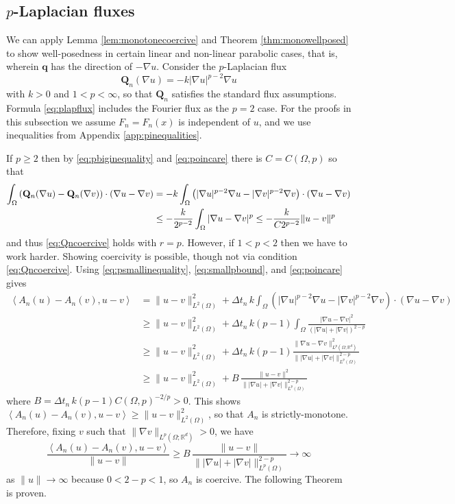 \documentclass[final,leqno,onefignum,onetabnum]{siamltex1213bueler}
\newcommand\bq{\mathbf{q}}
\newcommand\bQ{\mathbf{Q}}
\renewcommand{\grad}{\nabla}
\newcommand{\ip}[2]{\ensuremath{\left<#1,#2\right>}}
\newcommand\RR{\mathbb{R}}
\begin{document}
\subsection{$p$-Laplacian fluxes} \label{subsec:plap}  We can apply Lemma \ref{lem:monotonecoercive} and Theorem \ref{thm:monowellposed} to show well-posedness in certain linear and non-linear parabolic cases, that is, wherein $\bq$ has the direction of $-\grad u$.  Consider the $p$-Laplacian \cite{Evans2010} flux
\begin{equation}
  \bQ_n(\grad u) = - k |\grad u|^{p-2} \grad u \label{eq:plapflux}
\end{equation}
with $k>0$ and $1<p<\infty$, so that $\bQ_n$ satisfies the standard flux assumptions.  Formula \eqref{eq:plapflux} includes the Fourier flux as the $p=2$ case.  For the proofs in this subsection we assume $F_n=F_n(x)$ is independent of $u$, and we use inequalities from Appendix \ref{app:pinequalities}.

If $p\ge 2$ then by \eqref{eq:pbiginequality} and \eqref{eq:poincare} there is $C=C(\Omega,p)$ so that
\begin{align}
\int_\Omega \left(\bQ_n(\grad u) - \bQ_n(\grad v)\right)\cdot (\grad u - \grad v) &= -k  \int_\Omega \left(|\grad u|^{p-2} \grad u - |\grad v|^{p-2} \grad v\right)\cdot (\grad u - \grad v) \notag \\
  &\le - \frac{k}{2^{p-2}} \int_\Omega |\grad u - \grad v|^p \le - \frac{k}{C 2^{p-2}} \|u-v\|^p \label{eq:plapQnmono}
\end{align}
and thus \eqref{eq:Qncoercive} holds with $r=p$.  However, if  $1<p<2$ then we have to work harder.  Showing coercivity is possible, though not via condition \eqref{eq:Qncoercive}.  Using \eqref{eq:psmallinequality}, \eqref{eq:smallpbound}, and \eqref{eq:poincare} gives
\begin{align*}
\ip{A_n(u) - A_n(v)}{u-v} &= \|u-v\|_{L^2(\Omega)}^2 + \Delta t_n\,k \int_\Omega \left(|\grad u|^{p-2} \grad u - |\grad v|^{p-2} \grad v\right)\cdot (\grad u - \grad v) \\
  &\ge \|u-v\|_{L^2(\Omega)}^2 + \Delta t_n\,k (p-1) \int_\Omega \frac{|\grad u - \grad v|^2}{\left(|\grad u|+|\grad v|\right)^{2-p}} \\
  &\ge \|u-v\|_{L^2(\Omega)}^2 + \Delta t_n\,k (p-1) \frac{\|\grad u - \grad v\|_{L^p(\Omega; \RR^d)}^2}{\big\||\grad u|+|\grad v|\big\|_{L^p(\Omega)}^{2-p}} \\
  &\ge \|u-v\|_{L^2(\Omega)}^2 + B\, \frac{\|u - v\|^2}{\big\||\grad u|+|\grad v|\big\|_{L^p(\Omega)}^{2-p}}
\end{align*}
where $B = \Delta t_n\,k (p-1) C(\Omega,p)^{-2/p} >0$.  This shows $\ip{A_n(u) - A_n(v)}{u-v} \ge \|u-v\|_{L^2(\Omega)}^2$, so that $A_n$ is strictly-monotone.  Therefore, fixing $v$ such that $\|\grad v\|_{L^p(\Omega;\RR^d)} >0$, we have
\begin{equation*}
\frac{\ip{A_n(u) - A_n(v)}{u-v}}{\|u-v\|} \ge B\, \frac{\|u - v\|}{\big\||\grad u|+|\grad v|\big\|_{L^p(\Omega)}^{2-p}} \to \infty
\end{equation*}
as $\|u\|\to\infty$ because $0<2-p<1$, so $A_n$ is coercive.  The following Theorem is proven.
\end{document}
